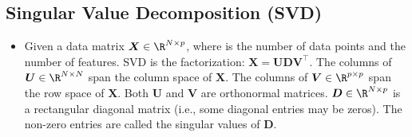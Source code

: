 \subsection{Singular Value Decomposition (SVD)}
    \begin{itemize}
        \item Given a data matrix $\bm{X} \in \R^{\ndata \times \nfeat}$, where \ndata is the number of data points and \nfeat the number of features.
        SVD is the factorization: $\bm{X} = \bm{U} \bm{D} \bm{V}^\top$.
        The columns of $\bm{U} \in \R^{\ndata \times \ndata}$ span the column space of $\bm{X}$.  
        The columns of $\bm{V} \in \R^{\nfeat \times \nfeat}$ span the row space of $\bm{X}$.
        Both $\bm{U}$ and $\bm{V}$ are orthonormal matrices.
        $\bm{D} \in \R^{\ndata \times \nfeat}$ is a rectangular diagonal matrix (i.e., some diagonal entries may be zeros).
        The non-zero entries are called the singular values of $\bm{D}$. 
    \end{itemize}
    
    
